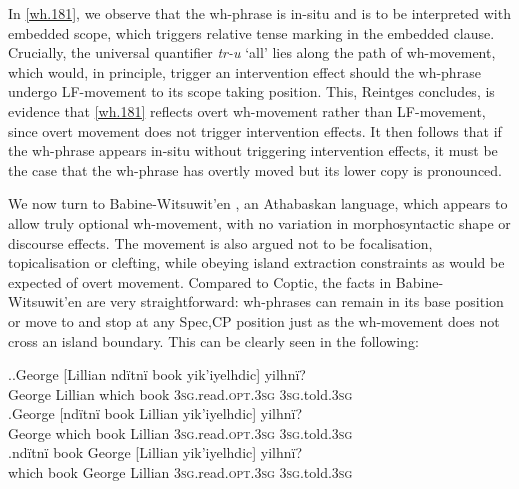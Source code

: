\documentclass{glossa}
\begin{document}
In \ref{wh.181}, we observe that the wh-phrase is in-situ and is to be interpreted with embedded scope, which triggers relative tense marking in the embedded clause. Crucially, the universal quantifier \textit{t\textepsilon r-u} `all' lies along the path of wh-movement, which would, in principle, trigger an intervention effect should the wh-phrase undergo LF-movement to its scope taking position. This, Reintges concludes, is evidence that \ref{wh.181} reflects overt wh-movement rather than LF-movement, since overt movement does not trigger intervention effects. It then follows that if the wh-phrase appears in-situ without triggering intervention effects, it must be the case that the wh-phrase has overtly moved but its lower copy is pronounced.
%
%

We now turn to Babine-Witsuwit'en \citep{denham:1997,denham:2000}, an Athabaskan language, which appears to allow truly optional wh-movement, with no variation in morphosyntactic shape or discourse effects. The movement is also argued not to be focalisation, topicalisation or clefting, while obeying island extraction constraints as would be expected of overt movement. Compared to Coptic, the facts in Babine-Witsuwit'en are very straightforward: wh-phrases can remain in its base position or move to and stop at any Spec,CP position just as the wh-movement does not cross an island boundary. This can be clearly seen in the following:

\ex.\ag.\label{wh.190a}George [Lillian nd\"itn\"i book yik'iyelhdic] yilhn\"i?\\
   George Lillian which book \textsc{3sg}.read.\textsc{opt.3sg} \textsc{3sg}.told.\textsc{3sg}\\
   \bg.\label{wh.190b}George [nd\"itn\"i book Lillian yik'iyelhdic] yilhn\"i?\\
   George which book Lillian \textsc{3sg}.read.\textsc{opt.3sg} \textsc{3sg}.told.\textsc{3sg}\\
   \bg.\label{wh.190c}nd\"itn\"i book George [Lillian yik'iyelhdic] yilhn\"i?\\
   which book George Lillian \textsc{3sg}.read.\textsc{opt.3sg} \textsc{3sg}.told.\textsc{3sg}\\
\end{document}
